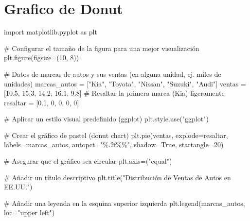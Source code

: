 \documentclass[
  jou,
  floatsintext,
  longtable,
  a4paper,
  nolmodern,
  notxfonts,
  notimes,
  colorlinks=true,linkcolor=blue,citecolor=blue,urlcolor=blue]{apa7}
\newenvironment{Shaded}{\begin{snugshade}}{\end{snugshade}}
\newcommand{\CommentTok}[1]{\textcolor[rgb]{0.37,0.37,0.37}{#1}}
\newcommand{\DecValTok}[1]{\textcolor[rgb]{0.68,0.00,0.00}{#1}}
\newcommand{\FloatTok}[1]{\textcolor[rgb]{0.68,0.00,0.00}{#1}}
\newcommand{\ImportTok}[1]{\textcolor[rgb]{0.00,0.46,0.62}{#1}}
\newcommand{\NormalTok}[1]{\textcolor[rgb]{0.00,0.23,0.31}{#1}}
\newcommand{\OperatorTok}[1]{\textcolor[rgb]{0.37,0.37,0.37}{#1}}
\newcommand{\SpecialCharTok}[1]{\textcolor[rgb]{0.37,0.37,0.37}{#1}}
\newcommand{\StringTok}[1]{\textcolor[rgb]{0.13,0.47,0.30}{#1}}
\newcommand{\VariableTok}[1]{\textcolor[rgb]{0.07,0.07,0.07}{#1}}
\begin{document}
\section{Grafico de Donut}\label{grafico-de-donut}

\begin{Shaded}
\begin{Highlighting}[]
\ImportTok{import}\NormalTok{ matplotlib.pyplot }\ImportTok{as}\NormalTok{ plt}

\CommentTok{\# Configurar el tamaño de la figura para una mejor visualización}
\NormalTok{plt.figure(figsize}\OperatorTok{=}\NormalTok{(}\DecValTok{10}\NormalTok{, }\DecValTok{8}\NormalTok{))}

\CommentTok{\# Datos de marcas de autos y sus ventas (en alguna unidad, ej. miles de unidades)}
\NormalTok{marcas\_autos }\OperatorTok{=}\NormalTok{ [}\StringTok{"Kia"}\NormalTok{, }\StringTok{"Toyota"}\NormalTok{, }\StringTok{"Nissan"}\NormalTok{, }\StringTok{"Suzuki"}\NormalTok{, }\StringTok{"Audi"}\NormalTok{]}
\NormalTok{ventas }\OperatorTok{=}\NormalTok{ [}\FloatTok{10.5}\NormalTok{, }\FloatTok{15.3}\NormalTok{, }\FloatTok{14.2}\NormalTok{, }\FloatTok{16.1}\NormalTok{, }\FloatTok{9.8}\NormalTok{]}
\CommentTok{\# Resaltar la primera marca (Kia) ligeramente}
\NormalTok{resaltar }\OperatorTok{=}\NormalTok{ [}\FloatTok{0.1}\NormalTok{, }\DecValTok{0}\NormalTok{, }\DecValTok{0}\NormalTok{, }\DecValTok{0}\NormalTok{, }\DecValTok{0}\NormalTok{]}

\CommentTok{\# Aplicar un estilo visual predefinido (ggplot)}
\NormalTok{plt.style.use(}\StringTok{"ggplot"}\NormalTok{)}

\CommentTok{\# Crear el gráfico de pastel (donut chart)}
\NormalTok{plt.pie(ventas, explode}\OperatorTok{=}\NormalTok{resaltar, labels}\OperatorTok{=}\NormalTok{marcas\_autos, autopct}\OperatorTok{=}\StringTok{"}\SpecialCharTok{\%.2f\%\%}\StringTok{"}\NormalTok{, shadow}\OperatorTok{=}\VariableTok{True}\NormalTok{, startangle}\OperatorTok{=}\DecValTok{20}\NormalTok{)}

\CommentTok{\# Asegurar que el gráfico sea circular}
\NormalTok{plt.axis}\OperatorTok{=}\NormalTok{(}\StringTok{"equal"}\NormalTok{)}

\CommentTok{\# Añadir un título descriptivo}
\NormalTok{plt.title(}\StringTok{"Distribución de Ventas de Autos en EE.UU."}\NormalTok{)}

\CommentTok{\# Añadir una leyenda en la esquina superior izquierda}
\NormalTok{plt.legend(marcas\_autos, loc}\OperatorTok{=}\StringTok{"upper left"}\NormalTok{)}


\end{Highlighting}
\end{Shaded}
\end{document}
